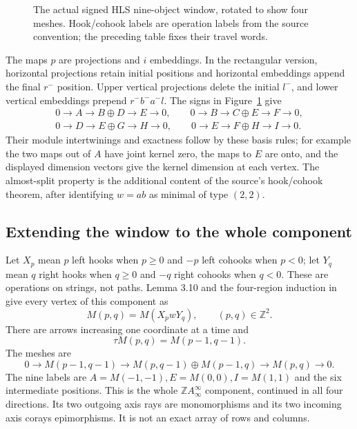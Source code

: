 \begin{figure}[htbp]\centering
{}
\caption{The actual signed HLS nine-object window, rotated to show four
meshes. Hook/cohook labels are operation labels from the source convention;
the preceding table fixes their travel words.}
\label{arb:diamond}
\end{figure}
The maps $p$ are projections and $i$ embeddings. In the rectangular version,
horizontal projections retain initial positions and horizontal embeddings
append the final $r^-$ position. Upper vertical projections delete the initial
$l^-$, and lower vertical embeddings prepend $r^-b^-a^-l$. The signs in
Figure~\ref{arb:diamond} give
\[
 \begin{gathered}
 0\to A\to B\oplus D\to E\to0,\qquad
 0\to B\to C\oplus E\to F\to0,\\
 0\to D\to E\oplus G\to H\to0,\qquad
 0\to E\to F\oplus H\to I\to0.
 \end{gathered}
\]
Their module intertwinings and exactness follow by these basis rules; for
example the two maps out of $A$ have joint kernel zero, the maps to $E$ are
onto, and the displayed dimension vectors give the kernel dimension at each
vertex. The almost-split property is the additional content of the source's
hook/cohook theorem, after identifying $w=ab$ as minimal of type $(2,2)$.

\subsection{Extending the window to the whole component}
Let $X_p$ mean $p$ left hooks when $p\ge0$ and $-p$ left cohooks when $p<0$;
let $Y_q$ mean $q$ right hooks when $q\ge0$ and $-q$ right cohooks when $q<0$.
These are operations on strings, not paths. Lemma 3.10 and the four-region
induction in \cite[Proposition 3.12]{ARBHLS} give every vertex of this component as
\[
 M(p,q)=M(X_p wY_q),\qquad (p,q)\in\mathbb Z^2.
\]
There are arrows increasing one coordinate at a time and
\[
 \tau M(p,q)=M(p-1,q-1).
\]
The meshes are
\[
 0\to M(p-1,q-1)\to M(p,q-1)\oplus M(p-1,q)\to M(p,q)\to0.
\]
The nine labels are $A=M(-1,-1),E=M(0,0),I=M(1,1)$ and the six intermediate
positions. This is the whole $\mathbb ZA_\infty^\infty$ component, continued in
all four directions. Its two outgoing axis rays are monomorphisms and its two
incoming axis corays epimorphisms. It is not an exact array of rows and columns.


